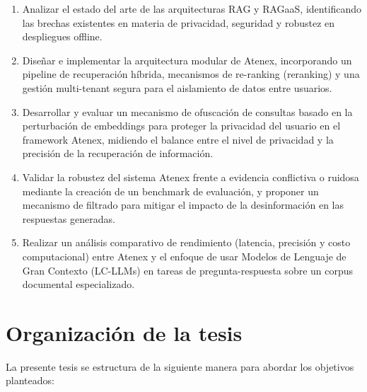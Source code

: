 \begin{enumerate}
    \item Analizar el estado del arte de las arquitecturas RAG y RAGaaS, identificando las brechas existentes en materia de privacidad, seguridad y robustez en despliegues offline.
    \item Diseñar e implementar la arquitectura modular de Atenex, incorporando un pipeline de recuperación híbrida, mecanismos de re-ranking (reranking) y una gestión multi-tenant segura para el aislamiento de datos entre usuarios.
    \item Desarrollar y evaluar un mecanismo de ofuscación de consultas basado en la perturbación de embeddings para proteger la privacidad del usuario en el framework Atenex, midiendo el balance entre el nivel de privacidad y la precisión de la recuperación de información.
    \item Validar la robustez del sistema Atenex frente a evidencia conflictiva o ruidosa mediante la creación de un benchmark de evaluación, y proponer un mecanismo de filtrado para mitigar el impacto de la desinformación en las respuestas generadas.
    \item Realizar un análisis comparativo de rendimiento (latencia, precisión y costo computacional) entre Atenex y el enfoque de usar Modelos de Lenguaje de Gran Contexto (LC-LLMs) en tareas de pregunta-respuesta sobre un corpus documental especializado.
\end{enumerate}

\section{Organización de la tesis}

La presente tesis se estructura de la siguiente manera para abordar los objetivos planteados:

